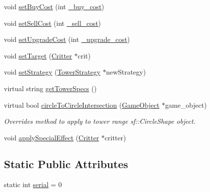 \begin{DoxyCompactItemize}
\item 
void \hyperlink{class_tower_ad103dd810daf5865560a9a8df0e9a783}{set\+Buy\+Cost} (int \hyperlink{class_tower_a102680a58c45f98a79609ce8961a7bed}{\+\_\+buy\+\_\+cost})
\item 
void \hyperlink{class_tower_ade5f41558a0240b5596a017a23334336}{set\+Sell\+Cost} (int \hyperlink{class_tower_a7f50414500ec524ccc6ffb7069328d1e}{\+\_\+sell\+\_\+cost})
\item 
void \hyperlink{class_tower_af0366aa989249fc2d8254b967dd2f9aa}{set\+Upgrade\+Cost} (int \hyperlink{class_tower_ade771f89ab1aecb165efb74592e71261}{\+\_\+upgrade\+\_\+cost})
\item 
void \hyperlink{class_tower_ac8251f835bd2a94690d1c6e4f1e18d93}{set\+Target} (\hyperlink{class_critter}{Critter} $\ast$crit)
\item 
void \hyperlink{class_tower_aa5280191c23e7cd98e9a1d9cfaba3416}{set\+Strategy} (\hyperlink{class_tower_strategy}{Tower\+Strategy} $\ast$new\+Strategy)
\item 
virtual string \hyperlink{class_tower_a2427fab36824f8ec98273cb5e563e0c9}{get\+Tower\+Specs} ()
\item 
virtual bool \hyperlink{class_tower_a518ff249dec05cdd026a830d845abfd2}{circle\+To\+Circle\+Intersection} (\hyperlink{class_game_object}{Game\+Object} $\ast$game\+\_\+object)
\begin{DoxyCompactList}\small\item\em Overrides method to apply to tower range sf\+::\+Circle\+Shape object. \end{DoxyCompactList}\item 
void \hyperlink{class_tower_a7df1e896cdd5cdf7cc2169d6d4f9a6cf}{apply\+Special\+Effect} (\hyperlink{class_critter}{Critter} $\ast$critter)
\end{DoxyCompactItemize}
\subsection*{Static Public Attributes}
\begin{DoxyCompactItemize}
\item 
static int \hyperlink{class_tower_a53001ebc47ba7e60fdb7eb1dcdd82a64}{serial} = 0
\end{DoxyCompactItemize}
